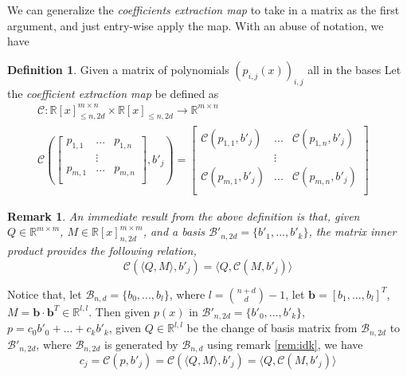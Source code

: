 \documentclass[12pt]{amsart}
\numberwithin{equation}{section}
\newtheorem{remark}[thm]{Remark}
\theoremstyle{definition}
\newtheorem{definition}[thm]{Definition}
\numberwithin{thm}{section}
\begin{document}
\smallskip 
We can generalize the \emph{coefficients extraction map} to take in a matrix as the first argument, and just entry-wise apply the map. With an abuse of notation, we have 
\begin{definition}
     Given a matrix of polynomials $(p_{i, j}(x))_{i, j}$ all in the bases Let the \emph{coefficient extraction map} be defined as 
     \begin{equation*}
          \begin{split}
               \mathcal{C}: \mathbb{R}[x]_{\leq n, 2d}^{m \times n} \times \mathbb{R}[x]_{\leq n, 2d} \rightarrow \mathbb{R}^{m \times n} & \\
               \mathcal{C}(
                    \begin{bmatrix} 
                         p_{1, 1} & ... & p_{1, n} \\
                         & \vdots \\
                         p_{m, 1} & ... & p_{m, n} \\
                    \end{bmatrix}, b'_j
               ) = \begin{bmatrix} 
                    \mathcal{C}(p_{1, 1}, b'_j) & ... &  \mathcal{C}(p_{1, n}, b'_j) \\
                    & \vdots \\
                    \mathcal{C}(p_{m, 1}, b'_j) & ... &  \mathcal{C}(p_{m, n}, b'_j) \\
                    \end{bmatrix}
          \end{split}
     \end{equation*}
\end{definition}

\begin{remark}
     An immediate result from the above definition is that, given $Q \in \mathbb{R}^{m \times m}$, $M \in \mathbb{R}[x]_{n, 2d}^{m \times m}$, 
     and a basis $\mathcal{B}'_{n, 2d} = \{b'_1, ..., b'_k\}$, the matrix inner product provides the following relation,
     \begin{equation*}
          \mathcal{C}(\langle Q, M \rangle, b'_j) = \langle Q, \mathcal{C}(M, b'_j) \rangle
     \end{equation*}
\end{remark}

\smallskip
Notice that, let $\mathcal{B}_{n, d} = \{b_0,...,b_l\}$, where $l = {n + d \choose d} - 1$, 
let $\mathbf{b} = [b_1, ..., b_l]^T$, $M = \mathbf{b} \cdot \mathbf{b}^T \in \mathbb{R}^{l, l}$. 
Then given $p(x)$ in $\mathcal{B}'_{n, 2d} = \{b'_0, ..., b'_k\}$, $p = c_0b'_0 + ... + c_k b'_k$, 
given $Q \in \mathbb{R}^{l, l}$ be the change of basis matrix from $\mathcal{B}_{n, 2d}$ to $\mathcal{B}'_{n, 2d}$, 
where $\mathcal{B}_{n, 2d}$ is generated by $\mathcal{B}_{n, d}$ using remark \ref{rem:idk}, we have
\begin{equation}
     c_j = \mathcal{C}(p, b'_j) = \mathcal{C}(\langle Q, M \rangle, b'_j ) = \langle Q, \mathcal{C}(M, b'_j) \rangle
\end{equation}
\end{document}
